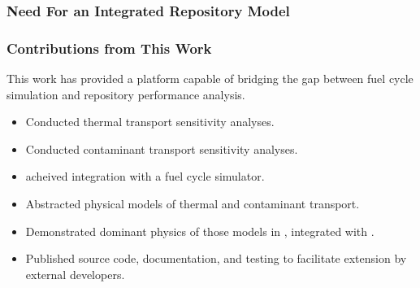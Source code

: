 


\begin{frame}[ctb!]
  \frametitle{Need For an Integrated Repository Model}

  

\end{frame}

\begin{frame}[ctb!]
\frametitle{Contributions from This Work}

This work has provided a platform capable of bridging the gap between fuel cycle 
simulation and repository performance analysis.

  \begin{itemize}
  \item Conducted thermal transport sensitivity analyses. \cite{huff_numerical_2012, huff_benchmarking_2012}
  \item Conducted contaminant transport sensitivity analyses. \cite{huff_key_2012}
  \item \Cyder acheived integration with a fuel cycle simulator.
  \item Abstracted physical models of thermal and contaminant transport. \cite{huff_hydrologic_2013}
  \item Demonstrated dominant physics of those models in \Cyder, integrated 
  with \Cyclus. \cite{huff_dynamic_2013, huff_cyclus_2013}
  \item Published source code, documentation, and testing to facilitate 
  extension by external developers. \cite{huff_cyder_2013}
  \end{itemize}
\end{frame}

